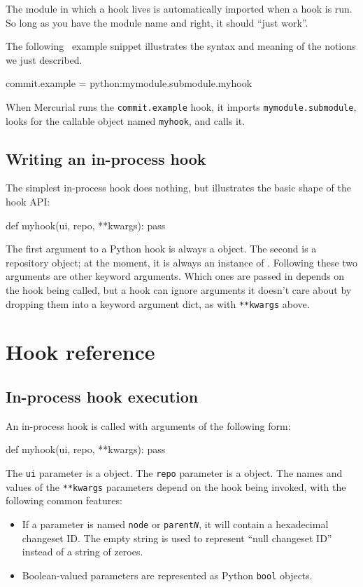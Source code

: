 The module in which a hook lives is automatically imported when a hook
is run.  So long as you have the module name and 
right, it should ``just work''.

The following \hgrc\ example snippet illustrates the syntax and
meaning of the notions we just described.
\begin{codesample2}
  [hooks]
  commit.example = python:mymodule.submodule.myhook
\end{codesample2}
When Mercurial runs the \texttt{commit.example} hook, it imports
\texttt{mymodule.submodule}, looks for the callable object named
\texttt{myhook}, and calls it.

\subsection{Writing an in-process hook}

The simplest in-process hook does nothing, but illustrates the basic
shape of the hook API:
\begin{codesample2}
  def myhook(ui, repo, **kwargs):
      pass
\end{codesample2}
The first argument to a Python hook is always a
 object.  The second is a repository object;
at the moment, it is always an instance of
.  Following these two
arguments are other keyword arguments.  Which ones are passed in
depends on the hook being called, but a hook can ignore arguments it
doesn't care about by dropping them into a keyword argument dict, as
with \texttt{**kwargs} above.

\section{Hook reference}
\label{sec:hook:ref}

\subsection{In-process hook execution}

An in-process hook is called with arguments of the following form:
\begin{codesample2}
  def myhook(ui, repo, **kwargs):
      pass
\end{codesample2}
The \texttt{ui} parameter is a  object.
The \texttt{repo} parameter is a
 object.  The
names and values of the \texttt{**kwargs} parameters depend on the
hook being invoked, with the following common features:
\begin{itemize}
\item If a parameter is named \texttt{node} or
  \texttt{parent\emph{N}}, it will contain a hexadecimal changeset ID.
  The empty string is used to represent ``null changeset ID'' instead
  of a string of zeroes.
\item Boolean-valued parameters are represented as Python
  \texttt{bool} objects.
\end{itemize}

